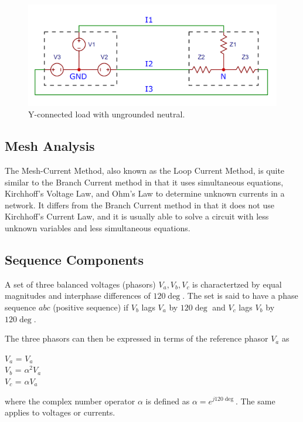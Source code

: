 \documentclass[a4paper,12pt]{article}
\begin{document}
  \begin{figure}[H]
    \centering
    \includegraphics[width=5in]{img/y-load.png}
    \caption{Y-connected load with ungrounded neutral.}
    \label{yload}
  \end{figure}

    \subsection{Mesh Analysis}
    The Mesh-Current Method, also known as the Loop Current Method, 
    is quite similar to the Branch Current method in that it uses simultaneous 
    equations, Kirchhoff’s Voltage Law, and Ohm’s Law to determine unknown 
    currents in a network. It differs from the Branch Current method in that 
    it does not use Kirchhoff’s Current Law, and it is usually able to solve 
    a circuit with less unknown variables and less simultaneous equations.

    \pagebreak
    \subsection{Sequence Components}
    A set of three balanced voltages (phasors) $V_a, V_b, V_c$ is charactertzed by equal
    magnitudes and interphase differences of $120\deg$. The set is said to have a phase
    sequence $abc$ (positive sequence) if $V_b$ lags $V_a$ by $120\deg$ and $V_c$ lags 
    $V_b$ by $120\deg$.

    The three phasors can then be expressed in terms of the reference phasor $V_a$ as
    \begin{center}
      $V_a$ = $V_a$\\
      $V_b$ = $\alpha^2 V_a$\\
      $V_c$ = $\alpha V_a$\\
    \end{center}
    where the complex number operator $\alpha$ is defined as $\alpha = e^{j 120\deg}$.
    The same applies to voltages or currents.
    
\end{document}
